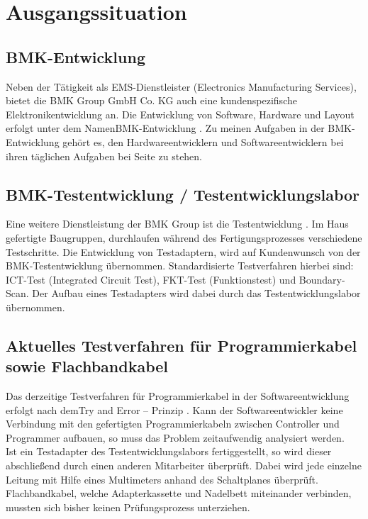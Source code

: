 

\section{Ausgangssituation}


\subsection{BMK-Entwicklung}
Neben der Tätigkeit als EMS-Dienstleister (Electronics Manufacturing Services), bietet die \glqq BMK Group GmbH  Co. KG \grqq{} auch eine kundenspezifische Elektronikentwicklung an. Die Entwicklung von Software, Hardware und Layout erfolgt unter dem Namen\glqq BMK-Entwicklung \grqq{} . 
Zu meinen Aufgaben in der BMK-Entwicklung gehört es, den Hardwareentwicklern und Softwareentwicklern bei ihren täglichen Aufgaben bei Seite zu stehen. 


\subsection{BMK-Testentwicklung / Testentwicklungslabor}
Eine weitere Dienstleistung der \glqq BMK Group \grqq{} ist die \glqq Testentwicklung \grqq{}. Im Haus gefertigte Baugruppen, durchlaufen während des Fertigungsprozesses verschiedene Testschritte. Die Entwicklung von Testadaptern, wird auf Kundenwunsch von der BMK-Testentwicklung übernommen. Standardisierte Testverfahren hierbei sind: ICT-Test (Integrated Circuit Test), FKT-Test (Funktionstest) und Boundary-Scan. Der Aufbau eines Testadapters wird dabei durch das Testentwicklungslabor übernommen. 



\subsection{Aktuelles Testverfahren für Programmierkabel sowie Flachbandkabel}
Das derzeitige Testverfahren für Programmierkabel in der Softwareentwicklung erfolgt nach dem\glqq Try and Error – Prinzip \grqq{} . Kann der Softwareentwickler keine Verbindung mit den gefertigten Programmierkabeln zwischen Controller und Programmer aufbauen, so muss das Problem zeitaufwendig analysiert werden.
\\
Ist ein Testadapter des Testentwicklungslabors fertiggestellt, so wird dieser abschließend durch einen anderen Mitarbeiter überprüft. Dabei wird jede einzelne Leitung mit Hilfe eines Multimeters anhand des Schaltplanes überprüft. Flachbandkabel, welche Adapterkassette und Nadelbett miteinander verbinden, mussten sich bisher keinen Prüfungsprozess unterziehen. 

